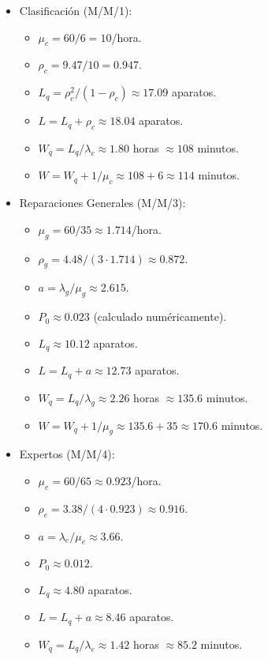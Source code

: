\documentclass[12pt]{article}
\begin{document}
\begin{itemize}
    \item Clasificación (M/M/1):
    \begin{itemize}
        \item $\mu_c = 60/6 = 10$/hora.
        \item $\rho_c = 9.47/10 = 0.947$.
        \item $L_q = \rho_c^2/(1 - \rho_c) \approx 17.09$ aparatos.
        \item $L = L_q + \rho_c \approx 18.04$ aparatos.
        \item $W_q = L_q/\lambda_c \approx 1.80$ horas $\approx 108$ minutos.
        \item $W = W_q + 1/\mu_c \approx 108 + 6 \approx 114$ minutos.
    \end{itemize}
    \item Reparaciones Generales (M/M/3):
    \begin{itemize}
        \item $\mu_g = 60/35 \approx 1.714$/hora.
        \item $\rho_g = 4.48/(3 \cdot 1.714) \approx 0.872$.
        \item $a = \lambda_g/\mu_g \approx 2.615$.
        \item $P_0 \approx 0.023$ (calculado numéricamente).
        \item $L_q \approx 10.12$ aparatos.
        \item $L = L_q + a \approx 12.73$ aparatos.
        \item $W_q = L_q/\lambda_g \approx 2.26$ horas $\approx 135.6$ minutos.
        \item $W = W_q + 1/\mu_g \approx 135.6 + 35 \approx 170.6$ minutos.
    \end{itemize}
    \item Expertos (M/M/4):
    \begin{itemize}
        \item $\mu_e = 60/65 \approx 0.923$/hora.
        \item $\rho_e = 3.38/(4 \cdot 0.923) \approx 0.916$.
        \item $a = \lambda_e/\mu_e \approx 3.66$.
        \item $P_0 \approx 0.012$.
        \item $L_q \approx 4.80$ aparatos.
        \item $L = L_q + a \approx 8.46$ aparatos.
        \item $W_q = L_q/\lambda_e \approx 1.42$ horas $\approx 85.2$ minutos.

\end{itemize}
\end{itemize}
\end{document}
